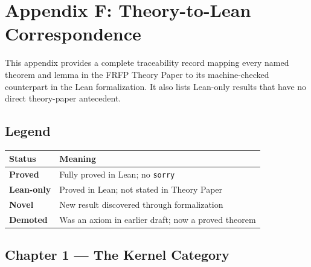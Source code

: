 \section{Appendix F: Theory-to-Lean Correspondence}
\label{app:theory_lean_map}

This appendix provides a complete traceability record mapping every named theorem
and lemma in the FRFP Theory Paper to its machine-checked counterpart in the Lean
formalization.  It also lists Lean-only results that have no direct theory-paper
antecedent.

\subsection*{Legend}

\begin{center}
\begin{tabular}{ll}
\toprule
Status & Meaning \\
\midrule
\textbf{Proved} & Fully proved in Lean; no \texttt{sorry} \\
\textbf{Lean-only} & Proved in Lean; not stated in Theory Paper \\
\textbf{Novel} & New result discovered through formalization \\
\textbf{Demoted} & Was an axiom in earlier draft; now a proved theorem \\
\bottomrule
\end{tabular}
\end{center}

\subsection*{Chapter 1 — The Kernel Category}

